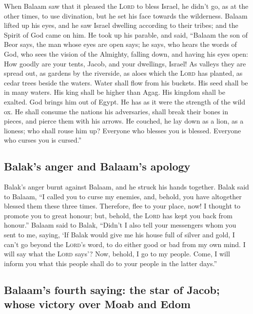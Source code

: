  When Balaam saw that it pleased the \textsc{Lord} to
bless Israel, he didn't go, as at the other times, to use divination,
but he set his face towards the wilderness.  Balaam lifted
up his eyes, and he saw Israel dwelling according to their tribes; and
the Spirit of God came on him.  He took up his parable,
and said, ``Balaam the son of Beor says, the man whose eyes are open
says;  he says, who hears the words of God, who sees the
vision of the Almighty, falling down, and having his eyes open:
 How goodly are your tents, Jacob, and your dwellings,
Israel!  As valleys they are spread out, as gardens by the
riverside, as aloes which the \textsc{Lord} has planted, as cedar trees
beside the waters.  Water shall flow from his buckets. His
seed shall be in many waters. His king shall be higher than Agag. His
kingdom shall be exalted.  God brings him out of Egypt. He
has as it were the strength of the wild ox. He shall consume the nations
his adversaries, shall break their bones in pieces, and pierce them with
his arrows.  He couched, he lay down as a lion, as a
lioness; who shall rouse him up? Everyone who blesses you is blessed.
Everyone who curses you is cursed.''

\hypertarget{balaks-anger-and-balaams-apology}{%
\subsection{Balak's anger and Balaam's
apology}\label{balaks-anger-and-balaams-apology}}

 Balak's anger burnt against Balaam, and he struck his
hands together. Balak said to Balaam, ``I called you to curse my
enemies, and, behold, you have altogether blessed them these three
times.  Therefore, flee to your place, now! I thought to
promote you to great honour; but, behold, the \textsc{Lord} has kept you
back from honour.''  Balaam said to Balak, ``Didn't I
also tell your messengers whom you sent to me, saying, 
`If Balak would give me his house full of silver and gold, I can't go
beyond the \textsc{Lord}'s word, to do either good or bad from my own
mind. I will say what the \textsc{Lord} says'?  Now,
behold, I go to my people. Come, I will inform you what this people
shall do to your people in the latter days.''

\hypertarget{balaams-fourth-saying-the-star-of-jacob-whose-victory-over-moab-and-edom}{%
\subsection{Balaam's fourth saying: the star of Jacob; whose victory
over Moab and
Edom}\label{balaams-fourth-saying-the-star-of-jacob-whose-victory-over-moab-and-edom}}

